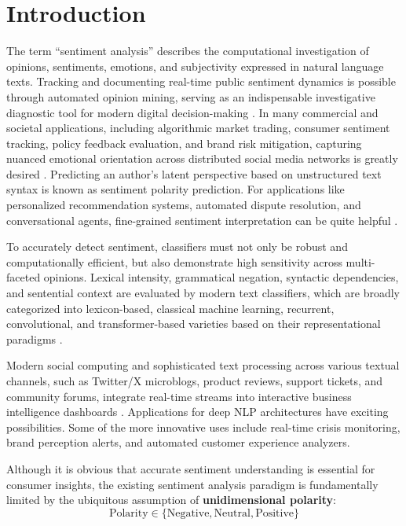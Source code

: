 \documentclass[conference]{IEEEtran}
\begin{document}
\section{Introduction}
The term ``sentiment analysis'' describes the computational investigation of opinions, sentiments, emotions, and subjectivity expressed in natural language texts. Tracking and documenting real-time public sentiment dynamics is possible through automated opinion mining, serving as an indispensable investigative diagnostic tool for modern digital decision-making \cite{pang2008opinion}. In many commercial and societal applications, including algorithmic market trading, consumer sentiment tracking, policy feedback evaluation, and brand risk mitigation, capturing nuanced emotional orientation across distributed social media networks is greatly desired \cite{liu2012sentiment}. Predicting an author's latent perspective based on unstructured text syntax is known as sentiment polarity prediction. For applications like personalized recommendation systems, automated dispute resolution, and conversational agents, fine-grained sentiment interpretation can be quite helpful \cite{socher2013recursive}.

To accurately detect sentiment, classifiers must not only be robust and computationally efficient, but also demonstrate high sensitivity across multi-faceted opinions. Lexical intensity, grammatical negation, syntactic dependencies, and sentential context are evaluated by modern text classifiers, which are broadly categorized into lexicon-based, classical machine learning, recurrent, convolutional, and transformer-based varieties based on their representational paradigms \cite{pontiki2016semeval}.

Modern social computing and sophisticated text processing across various textual channels, such as Twitter/X microblogs, product reviews, support tickets, and community forums, integrate real-time streams into interactive business intelligence dashboards \cite{mohammad2013crowdsourcing}. Applications for deep NLP architectures have exciting possibilities. Some of the more innovative uses include real-time crisis monitoring, brand perception alerts, and automated customer experience analyzers.

Although it is obvious that accurate sentiment understanding is essential for consumer insights, the existing sentiment analysis paradigm is fundamentally limited by the ubiquitous assumption of \textbf{unidimensional polarity}:
\begin{equation}
\text{Polarity} \in \{\text{Negative}, \text{Neutral}, \text{Positive}\}
\end{equation}
\end{document}
